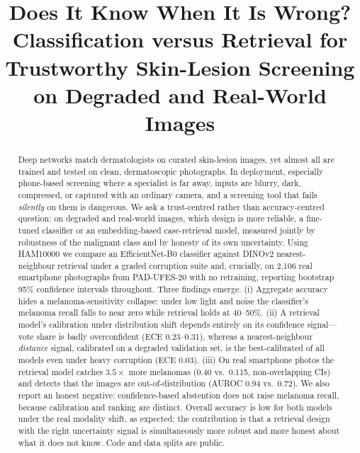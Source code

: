 \documentclass[conference]{IEEEtran}
\begin{document}
\title{Does It Know When It Is Wrong? Classification versus
Retrieval for Trustworthy Skin-Lesion Screening on Degraded and
Real-World Images}

\author{
}

\maketitle

\begin{abstract}
Deep networks match dermatologists on curated skin-lesion images, yet almost
all are trained and tested on clean, dermatoscopic photographs. In deployment,
especially phone-based screening where a specialist is far away, inputs are
blurry, dark, compressed, or captured with an ordinary camera, and a screening
tool that fails \emph{silently} on them is dangerous. We ask a trust-centred
rather than accuracy-centred question: on degraded and real-world images, which
design is more reliable, a fine-tuned classifier or an embedding-based
case-retrieval model, measured jointly by robustness of the malignant class and
by honesty of its own uncertainty. Using HAM10000 we compare an
EfficientNet-B0 classifier against DINOv2 nearest-neighbour retrieval under a
graded corruption suite and, crucially, on 2{,}106 real smartphone photographs
from PAD-UFES-20 with no retraining, reporting bootstrap 95\% confidence
intervals throughout. Three findings emerge. (i) Aggregate accuracy hides a
melanoma-sensitivity collapse: under low light and noise the classifier's
melanoma recall falls to near zero while retrieval holds at 40--50\%. (ii) A
retrieval model's calibration under distribution shift depends entirely on its
confidence signal---vote share is badly overconfident (ECE 0.23--0.31), whereas
a nearest-neighbour \emph{distance} signal, calibrated on a degraded validation
set, is the best-calibrated of all models even under heavy corruption (ECE
0.03). (iii) On real smartphone photos the retrieval model catches $3.5\times$
more melanomas (0.40 vs.\ 0.115, non-overlapping CIs) and detects that the
images are out-of-distribution (AUROC 0.94 vs.\ 0.72). We also report an honest
negative: confidence-based abstention does not raise melanoma recall, because
calibration and ranking are distinct. Overall accuracy is low for both models
under the real modality shift, as expected; the contribution is that a
retrieval design with the right uncertainty signal is simultaneously more
robust and more honest about what it does not know. Code and data splits are
public.
\end{abstract}
\end{document}
